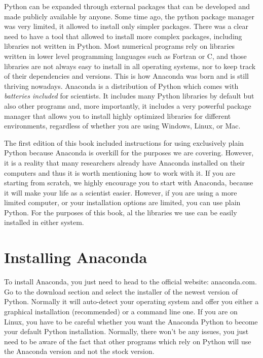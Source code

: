 Python can be expanded through external packages that can be developed and made publicly available by anyone. Some time ago, the python package manager was very limited, it allowed to install only simpler packages. There was a clear need to have a tool that allowed to install more complex packages, including libraries not written in Python. Most numerical programs rely on libraries written in lower level programming languages such as Fortran or C, and those libraries are not always easy to install in all operating systems, nor to keep track of their dependencies and versions. This is how Anaconda was born and is still thriving nowadays. Anaconda is a distribution of Python which comes with \emph{batteries included} for scientists. It includes many Python libraries by default but also other programs and, more importantly, it includes a very powerful package manager that allows you to install highly optimized libraries for different environments, regardless of whether you are using Windows, Linux, or Mac. 

The first edition of this book included instructions for using exclusively plain Python because Anaconda is overkill for the purposes we are covering. However, it is a reality that many researchers already have Anaconda installed on their computers and thus it is worth mentioning how to work with it. If you are starting from scratch, we highly encourage you to start with Anaconda, because it will make your life as a scientist easier. However, if you are using a more limited computer, or your installation options are limited, you can use plain Python. For the purposes of this book, al the libraries we use can be easily installed in either system. 

\section{Installing Anaconda}
To install Anaconda, you just need to head to the official website: anaconda.com. Go to the download section and select the installer of the newest version of Python. Normally it will auto-detect your operating system and offer you either a graphical installation (recommended) or a command line one. If you are on Linux, you have to be careful whether you want the Anaconda Python to become your default Python installation. Normally, there won't be any issues, you just need to be aware of the fact that other programs which rely on Python will use the Anaconda version and not the stock version. 


